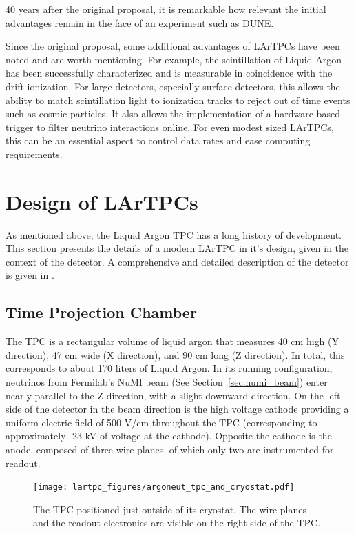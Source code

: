 40 years after the original proposal, it is remarkable how relevant the initial advantages remain in the face of an experiment such as DUNE. 

Since the original proposal, some additional advantages of LArTPCs have been noted and are worth mentioning.  For example, the scintillation of Liquid Argon has been successfully characterized \cite{lar_scintillation} and is measurable in coincidence with the drift ionization.  For large detectors, especially surface detectors, this allows the ability to match scintillation light to ionization tracks to reject out of time events such as cosmic particles.  It also allows the implementation of a hardware based trigger to filter neutrino interactions online.  For even modest sized LArTPCs, this can be an essential aspect to control data rates and ease computing requirements.

\section{Design of LArTPCs}
\label{sec:argoneut_detector}

As mentioned above, the Liquid Argon TPC has a long history of development.  This section presents the details of a modern LArTPC in it's design, given in the context of the \argoneut detector. A comprehensive and detailed description of the \argoneut detector is given in \cite{Anderson:2012vc}.

\subsection{\argoneut Time Projection Chamber}

The \argoneut TPC is a rectangular volume of liquid argon that measures 40 cm high (Y direction), 47 cm wide (X direction), and 90 cm long (Z direction).  In total, this corresponds to about 170 liters of Liquid Argon.  In its running configuration, neutrinos from Fermilab's NuMI beam (See Section~\ref{sec:numi_beam}) enter nearly parallel to the Z direction, with a slight downward direction.  On the left side of the detector in the beam direction is the high voltage cathode providing a uniform electric field of 500 V/cm throughout the TPC (corresponding to approximately -23 kV of voltage at the cathode).  Opposite the cathode is the anode, composed of three wire planes, of which only two are instrumented for readout.

\begin{figure}[htbp]
  \centering
  \texttt{[image: lartpc\_figures/argoneut\_tpc\_and\_cryostat.pdf]}
  \caption[The \argoneut TPC]{The \argoneut TPC positioned just outside of its cryostat.  The wire planes and the readout electronics are visible on the right side of the TPC.}
  \label{fig:argoneut_tpc}
\end{figure}

